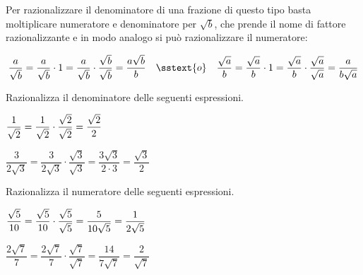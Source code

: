 Per razionalizzare il denominatore di una frazione di questo tipo basta 
moltiplicare numeratore e denominatore per \(\sqrt b\), che prende il 
nome di fattore razionalizzante e in modo analogo si può razionalizzare il 
numeratore: 

\[\dfrac{a}{\sqrt b} = \dfrac{a}{\sqrt b} \cdot 1 = 
\dfrac{a}{\sqrt b} \cdot \dfrac{\sqrt b}{\sqrt b} = 
\dfrac{a\sqrt b}b \quad \sstext{o} \quad 
\dfrac {\sqrt{a}}{b} = \dfrac {\sqrt{a}}{b} \cdot 1 = 
\dfrac {\sqrt{a}}{b} \cdot \dfrac{\sqrt a}{\sqrt a}= 
\dfrac{a}{b\sqrt{a}}\]


\begin{esempio}{}{}
Razionalizza il denominatore delle seguenti espressioni.

\begin{itemize*} [left=0mm]
\item 
\(\dfrac{1}{\sqrt{2}} = 
\dfrac{1}{\sqrt{2}} \cdot \dfrac{\sqrt{2}}{\sqrt{2}}=
\dfrac{\sqrt{2}}{2} \hspace{20mm}\)
\item 
\(\dfrac{3}{2\sqrt{3}} = 
\dfrac{3}{2\sqrt{3}} \cdot \dfrac{\sqrt{3}}{\sqrt{3}} =
\dfrac{3\sqrt{3}}{2\cdot 3} =\dfrac{\sqrt{3}}{2}\)
\end{itemize*}
\end{esempio}

\begin{esempio}{}{}
Razionalizza il numeratore delle seguenti espressioni.

\begin{itemize*} [left=0mm]
\item 
\(\dfrac{\sqrt{5}}{10} = 
\dfrac{\sqrt{5}}{10} \cdot \dfrac{\sqrt{5}}{\sqrt{5}}=
\dfrac{5}{10\sqrt{5}}=
\dfrac{1}{2\sqrt{5}} \hspace{5mm}\)
\item 
\(\dfrac{2\sqrt{7}}{7} = 
\dfrac{2\sqrt{7}}{7} \cdot \dfrac{\sqrt{7}}{\sqrt{7}} =
\dfrac{14}{7 \sqrt{7}} =\dfrac{2}{\sqrt{7}}\)
\end{itemize*}
\end{esempio}

